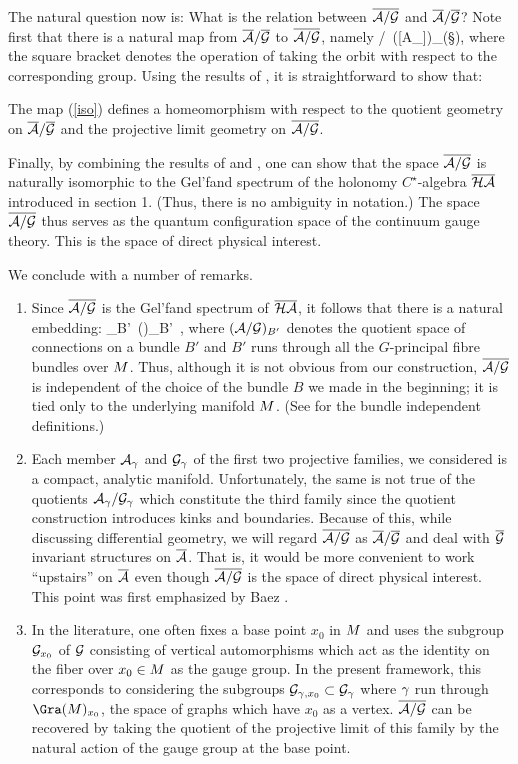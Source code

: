 The natural question now is: What is the relation between $\agb$ and
$\Ab/\Gb$? Note first that there is a natural map from $\Ab/\Gb$ to 
$\overline{\A/\G}$, namely
\be \label{iso}
\Ab/\Gb\ni[(A_\g)_{\g\in\Gra(\S)}] \mapsto\   
([A_\g])_{\g\in\Gra(\S)}\in \overline {\A/\G},
\ee
where the square bracket denotes the operation of taking the orbit
with respect to the corresponding group. Using the results of
\cite{MM,AL2}, it is straightforward to show that:

\begin{proposition}
The map (\ref{iso}) defines a homeomorphism with respect to the quotient 
geometry on $\Ab/\Gb$ and the projective limit geometry on 
$\overline{\A/\G}$.
\end{proposition}

Finally, by combining the results of \cite{B1} and \cite{AL2}, one
can show that the space $\agb$ is naturally isomorphic to the Gel'fand
spectrum of the holonomy $C^\star$-algebra $\HAbar$ introduced in
section 1. (Thus, there is no ambiguity in notation.) The space $\agb$
thus serves as the quantum configuration space of the continuum gauge
theory. This is the space of direct physical interest.

We conclude with a number of remarks.
\begin{enumerate}
\item Since $\agb$ is the Gel'fand spectrum of $\HAbar$, it follows 
\cite{AL1} that there is a natural embedding:
\be
\bigcup_{B'}\ (\ag)_{B'}\ \rightarrow \agb,
\ee
where $(\ag)_{B'}$ denotes the quotient space of connections on a bundle
$B'$ and $B'$ runs through all the $G$-principal fibre bundles over
$\S$. Thus, although it is not obvious from our construction, $\agb$
is independent of the choice of the bundle $B$ we made in the
beginning; it is tied only to the underlying manifold $\S$. (See
\cite{AI,AL1,B1,MM} for the bundle independent definitions.)
\item Each member $\A_\g$ and $\G_\g$ of the first two projective 
families, we considered is a compact, analytic manifold.
Unfortunately, the same is not true of the quotients $\A_\g/\G_\g$
which constitute the third family since the quotient construction
introduces kinks and boundaries.  Because of this, while discussing
differential geometry, we will regard $\agb$ as $\Ab/\Gb$ and deal
with $\Gb$ invariant structures on $\Ab$. That is, it would be more
convenient to work ``upstairs'' on $\Ab$ even though $\agb$ is the
space of direct physical interest. This point was first emphasized by
Baez \cite{B1, B2}.

\item In the literature, one often fixes a base point $x_0$ in $\S$ 
and uses the subgroup $\G_{x_0}$ of $\G$ consisting of vertical
automorphisms which act as the identity on the fiber over $x_0\in\S$
as the gauge group. In the present framework, this corresponds to
considering the subgroups $\G_{\g,x_0}\subset\G_{\g}$ where $\g$ run
through $\Gra(\S)_{x_0}$, the space of graphs which have $x_0$ as a
vertex. $\agb$ can be recovered by taking the quotient of the
projective limit of this family by the natural action of the gauge
group at the base point.
\end{enumerate}

